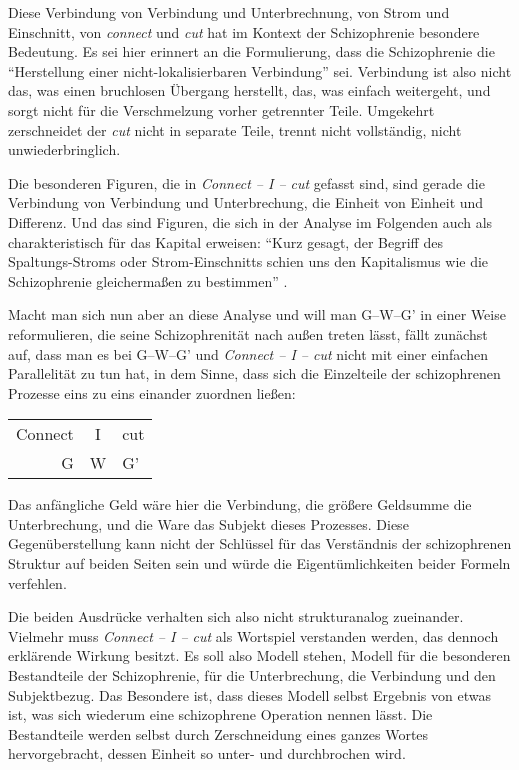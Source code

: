 \documentclass[12pt,
               DIV13,
               paper=a4,
               twoside=false,
               onehalfspacing,
               bibliography=totoc,
               toc=graduated,
               draft,
               ]{scrartcl}
\newcommand{\pc}[2]{\parencite[#1]{#2}}
\newcommand{\worries}[1]{\ifdraft{\textcolor{blue}{\texttt{(#1)}}}{}}
\newcommand{\gwg}{G--W--G'\xspace}
\newcommand{\cic}{Connect -- I -- cut\xspace}
\begin{document}

Diese Verbindung von Verbindung und Unterbrechnung, von Strom und
Einschnitt, von \emph{connect} und \emph{cut} hat im Kontext der
Schizophrenie besondere Bedeutung. Es sei hier erinnert an die
Formulierung, dass die Schizophrenie die "`Herstellung einer
nicht-lokalisierbaren Verbindung"' \pc{19}{schizg} sei. Verbindung ist
also nicht das, was einen bruchlosen Übergang herstellt, das, was
einfach weitergeht, und sorgt nicht für die Verschmelzung vorher
getrennter Teile. Umgekehrt zerschneidet der \emph{cut} nicht in
separate Teile, trennt nicht vollständig, nicht unwiederbringlich.

Die besonderen Figuren, die in \emph{\cic} gefasst sind, sind gerade
die Verbindung von Verbindung und Unterbrechung, die Einheit von
Einheit und Differenz. Und das sind Figuren, die sich in der Analyse
im Folgenden auch als charakteristisch für das Kapital erweisen:
"`Kurz gesagt, der Begriff des Spaltungs-Stroms oder Strom-Einschnitts
schien uns den Kapitalismus wie die Schizophrenie gleichermaßen zu
bestimmen"' \pc{317}{ao}.



Macht man sich nun aber an diese Analyse und will man \gwg in einer
Weise reformulieren, die seine Schizophrenität nach außen treten
lässt, fällt zunächst auf, dass man es bei \gwg und \emph{\cic} nicht
mit einer einfachen Parallelität zu tun hat, in dem Sinne, dass sich
die Einzelteile der schizophrenen Prozesse eins zu eins einander
zuordnen ließen:

{\centering\hfill
\begin{tabular}{r@{ -- }c@{ -- }l}
Connect & I & cut\\
G & W & G'
\end{tabular}
\hfill}

Das anfängliche Geld wäre hier die Verbindung, die größere Geldsumme
die Unterbrechung, und die Ware das Subjekt dieses Prozesses. Diese
Gegenüberstellung kann nicht der Schlüssel für das Verständnis der
schizophrenen Struktur auf beiden Seiten sein und würde die
Eigentümlichkeiten beider Formeln verfehlen.

Die beiden Ausdrücke verhalten sich also nicht strukturanalog
zueinander. Vielmehr muss \emph{\cic} als Wortspiel verstanden werden,
das dennoch erklärende Wirkung besitzt. Es soll also Modell stehen,
Modell für die besonderen Bestandteile der Schizophrenie, für die
Unterbrechung, die Verbindung und den Subjektbezug. Das Besondere ist,
dass dieses Modell selbst Ergebnis von etwas ist, was sich wiederum
eine schizophrene Operation nennen lässt. Die Bestandteile werden
selbst durch Zerschneidung eines ganzes Wortes hervorgebracht, dessen
Einheit so unter- und durchbrochen wird.
\end{document}
